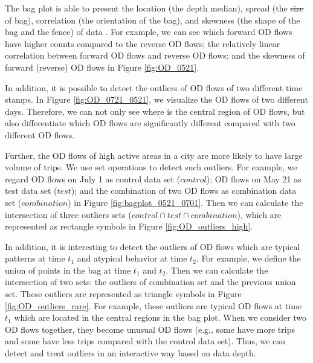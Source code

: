 \documentclass[a4paper,UKenglish]{lipics-v2016}
\providecommand{\DIFadd}[1]{{\protect\color{blue}\uwave{#1}}} %
\providecommand{\DIFdel}[1]{{\protect\color{red}\sout{#1}}}                      %
\providecommand{\DIFaddbegin}{} %
\providecommand{\DIFaddend}{} %
\providecommand{\DIFdelbegin}{} %
\providecommand{\DIFdelend}{} %
\begin{document}
The bag plot is able to present the location (the depth median), spread (the \DIFdelbegin \DIFdel{size }\DIFdelend \DIFaddbegin \DIFadd{spatial extent }\DIFaddend of bag), correlation (the orientation of the bag), and skewness (the shape of the bag and the fence) of data \cite{rousseeuw99AS}. For example, we can see which forward OD flows have higher counts compared to the reverse OD flows; the relatively linear correlation between forward OD flows and reverse OD flows; and the skewness of forward (reverse) OD flows in Figure \ref{fig:OD_0521}. 

In addition, it is possible to detect the outliers of OD flows of two different time stamps. In Figure \ref{fig:OD_0721_0521}, we visualize the OD flows of two different days. Therefore, we can not only see where is the central region of OD flows, but also differentiate which OD flows are significantly different compared with two different OD flows.

Further, the OD flows of high active areas in a city are more likely to have large volume of trips. We use set operations to detect such outliers. For example, we regard OD flows on July 1  as control data set ($control$); OD flows on May 21 as test data set ($test$); and the combination of two OD flows as combination data set ($combination$) in Figure \ref{fig:bagplot_0521_0701}. Then we can calculate the intersection of three outliers sets ($control \cap test \cap combination$), which are represented as rectangle symbols in Figure \ref{fig:OD_outliers_high}. 

In addition, it is interesting to detect the outliers of OD flows which are typical patterns at time $t_1$ and atypical behavior at time $t_2$.  For example, we define the union of points in the bag at time $t_1$ and $t_2$. Then we can calculate the intersection of two sets: the outliers of combination set and the previous union set. These outliers are represented as triangle symbols in Figure \ref{fig:OD_outliers_rare}. For example, these outliers are typical OD flows at time $t_1$ which are located in the central regions in the bag plot. When we consider two OD flows together, they become unusual OD flows (e.g., some have more trips and some have less trips compared with the control data set). Thus, we can detect and treat outliers in an interactive way based on data depth.

\end{document}
